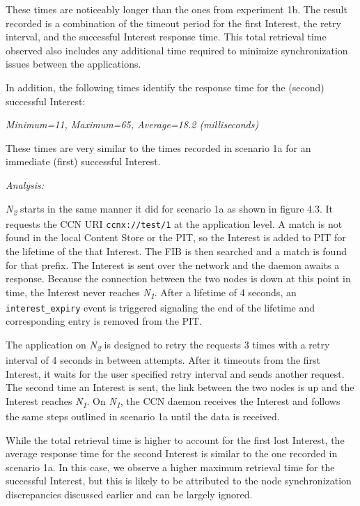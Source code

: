 \documentclass[a4paper,12pt]{report}      %
\begin{document}
These times are noticeably longer than the ones from experiment 1b. The result recorded is a combination of the timeout period for
the first Interest, the retry interval, and the successful Interest response time. This total retrieval time observed also includes any additional time required to minimize synchronization issues between the applications.

In addition, the following times identify the response time for the (second) successful Interest:
\begin{center}\textsl{Minimum=11, Maximum=65, Average=18.2 (milliseconds)}\end{center}
These times are very similar to the times recorded in scenario 1a for an immediate (first) successful
Interest.

\vspace*{1\baselineskip}\noindent\emph{Analysis:}

 \emph{N\textsubscript{2}} starts in the same manner it did for scenario 1a as shown in figure 4.3. It requests the CCN URI
\verb!ccnx://test/1! at the application level. A match is not found in the local Content Store or the PIT, so
the Interest is added to PIT for the lifetime of the that Interest. 
The FIB is then searched and a match is found for that prefix. The Interest is sent over the network and
the daemon awaits a response. Because the connection between the two nodes is down at this point in
time, the Interest never reaches  \emph{N\textsubscript{1}}. After a lifetime of 4 seconds, an \verb!interest_expiry!
 event is triggered signaling the end of the lifetime and corresponding entry is removed from the PIT.

The application on \emph{N\textsubscript{2}} is designed to retry the requests 3 times with a retry interval of 4 seconds in
between attempts. After it timeouts from the first Interest, it waits for the user specified retry
interval and sends another request. The second time an Interest is sent, the link between the two
nodes is up and the Interest reaches \emph{N\textsubscript{1}}. On \emph{N\textsubscript{1}}, the CCN daemon receives the Interest and follows the same steps outlined in scenario 1a until the data is received. 

While the total retrieval time is higher to account for the first lost Interest, the average response time for the second Interest is similar to the one recorded in scenario 1a. In this case, we observe a higher maximum retrieval time for the successful Interest, but this is likely to be attributed to the node synchronization discrepancies discussed earlier and can be largely ignored.
\end{document}
